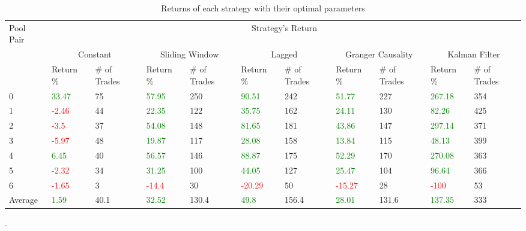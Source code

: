 \begin{table}[!htb]
    \centering
    \begin{adjustwidth}{-0.8in}{-0.9in}
        \begin{tabular}{|p{4em}|p{3em}|p{3em}|p{3em}|p{3em}|p{3em}|p{3em}|p{3em}|p{3em}|p{3em}|p{3em}|}\hline
            Pool Pair & \multicolumn{10}{|c|}{Strategy's Return} \\\cline{2-11}
            & \multicolumn{2}{|c|}{Constant} & \multicolumn{2}{|c|}{Sliding Window} & \multicolumn{2}{|c|}{Lagged} & \multicolumn{2}{|c|}{Granger Causality} & \multicolumn{2}{|c|}{Kalman Filter}\\\cline{2-11}
            & Return \% & \# of Trades & Return \% & \# of Trades & Return \% & \# of Trades & Return \% & \# of Trades & Return \% & \# of Trades\\\hline
            0 & \textcolor{green}{33.47} & 75 & \textcolor{green}{57.95} & 250 & \textcolor{green}{90.51} & 242 & \textcolor{green}{51.77} & 227 & \textcolor{green}{267.18} & 354\\\cline{2-11}
            1 & \textcolor{red}{-2.46} & 44 & \textcolor{green}{22.35} & 122 & \textcolor{green}{35.75} & 162 & \textcolor{green}{24.11} & 130 & \textcolor{green}{82.26} & 425\\\cline{2-11}
            2 & \textcolor{red}{-3.5} & 37 & \textcolor{green}{54.08} & 148 & \textcolor{green}{81.65} & 181 & \textcolor{green}{43.86} & 147 & \textcolor{green}{297.14} & 371\\\cline{2-11}
            3 & \textcolor{red}{-5.97} & 48 & \textcolor{green}{19.87} & 117 & \textcolor{green}{28.08} & 158 & \textcolor{green}{13.84} & 115 & \textcolor{green}{48.13} & 399\\\cline{2-11}
            4 & \textcolor{green}{6.45} & 40 & \textcolor{green}{56.57} & 146 & \textcolor{green}{88.87} & 175 & \textcolor{green}{52.29} & 170 & \textcolor{green}{270.08} & 363\\\cline{2-11}
            5 & \textcolor{red}{-2.32} & 34 & \textcolor{green}{31.25} & 100 & \textcolor{green}{44.05} & 127 & \textcolor{green}{25.47} & 104 & \textcolor{green}{96.64} & 366\\\cline{2-11}
            6 & \textcolor{red}{-1.65} & 3 & \textcolor{red}{-14.4} & 30 & \textcolor{red}{-20.29} & 50 & \textcolor{red}{-15.27} & 28 & \textcolor{red}{-100} & 53\\\hline\hline            
            Average & \textcolor{green}{1.59} & 40.1 & \textcolor{green}{32.52} & 130.4 & \textcolor{green}{49.8} & 156.4 & \textcolor{green}{28.01} & 131.6 & \textcolor{green}{137.35} & 333\\\hline            
        \end{tabular}
    \end{adjustwidth}
    \caption{Returns of each strategy with their optimal parameters \label{tab:FinalResults}}.
\end{table}

